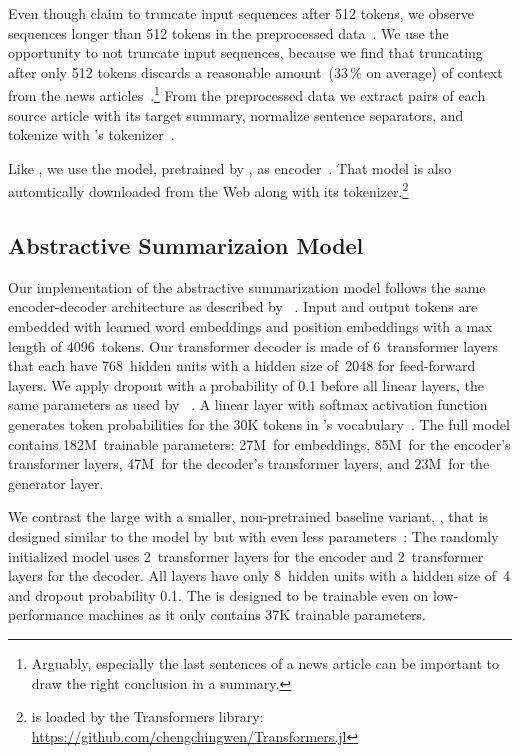 Even though \citeauthor{LiuL2019} claim to truncate input sequences after 512 tokens, we observe sequences longer than 512 tokens in the preprocessed data~\cite{LiuL2019}.
We use the opportunity to not truncate input sequences, because we find that truncating after only 512 tokens discards a reasonable amount~(33\,\% on average) of context from the news articles~\cite{NallapatiZSGX2016}.\footnote{Arguably, especially the last sentences of a news article can be important to draw the right conclusion in a summary.}
From the preprocessed data we extract pairs of each source article with its target summary, normalize sentence separators, and tokenize with \Bert's \WordPiece tokenizer~\cite{DevlinCLT2019}.

Like \citeauthor{LiuL2019}, we use the \BertBase model, pretrained by \citeauthor{DevlinCLT2019}, as encoder~\cite{DevlinCLT2019}.
That \Bert model is also automtically downloaded from the Web along with its \WordPiece tokenizer.\footnote{\Bert is loaded by the Transformers library: \url{https://github.com/chengchingwen/Transformers.jl}}

\subsection{Abstractive Summarizaion Model}

Our implementation of the \BertSumAbs abstractive summarization model follows the same encoder-decoder architecture as described by \citeauthor{LiuL2019}~\cite{LiuL2019}.
Input and output tokens are embedded with learned word embeddings and position embeddings with a max length of 4096~tokens.
Our transformer decoder is made of 6~transformer layers that each have 768~hidden units with a hidden size of~2048 for feed-forward layers.
We apply dropout with a probability of 0.1 before all linear layers, the same parameters as used by \citeauthor{LiuL2019}~\cite{LiuL2019}.
A linear layer with softmax activation function generates token probabilities for the 30K tokens in \Bert's vocabulary~\cite{DevlinCLT2019}.
The full \BertSumAbs model contains 182M~trainable parameters: 27M~for embeddings, 85M~for the encoder's transformer layers, 47M~for the decoder's transformer layers, and 23M~for the generator layer.

We contrast the large \BertSumAbs with a smaller, non-pretrained baseline variant, \TransformerAbsTiny, that is designed similar to the \TransformerAbs model by \citeauthor{LiuL2019} but with even less parameters~\cite{LiuL2019}: The randomly initialized model uses 2~transformer layers for the encoder and 2~transformer layers for the decoder. All layers have only 8~hidden units with a hidden size of~4 and dropout probability 0.1.
The \TransformerAbsTiny is designed to be trainable even on low-performance machines as it only contains 37K trainable parameters.

